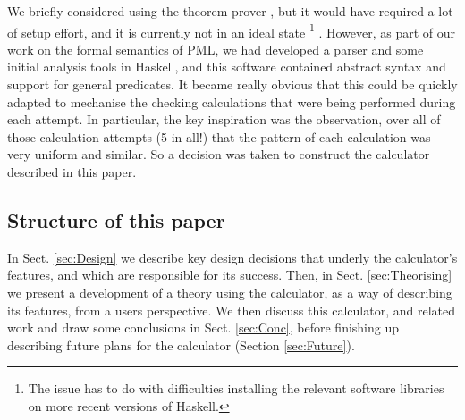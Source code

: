 We briefly considered using the  theorem prover
\cite{DBLP:conf/utp/Butterfield10,DBLP:conf/utp/Butterfield12},
but it would have required a lot of setup effort,
and it is currently not in an ideal state%
\footnote{The issue has to do with difficulties installing
the relevant software libraries
on more recent versions of Haskell.}
.
However, as part of our work on the formal semantics of PML,
we had developed a parser and some initial analysis tools
in Haskell\cite{Haskell2010},
and this software contained abstract syntax and support
for general predicates.
It became really obvious that this could be quickly adapted
to mechanise the checking calculations that were being performed
during each attempt.
In particular,
the key inspiration was the observation,
over all of those calculation attempts (5 in all!)
that the pattern of each calculation was very uniform and similar.
So a decision was taken to construct the calculator described in this paper.



\subsection{Structure of this paper}

In Sect. \ref{sec:Design}
we describe key design decisions
that underly the calculator's features,
and which are responsible for its success.
Then, in Sect. \ref{sec:Theorising}
we present a development of a theory using the calculator,
as a way of describing its features, from a users perspective.
We then discuss this calculator, and related work
and draw some conclusions in Sect. \ref{sec:Conc},
before finishing up describing future plans for the calculator
(Section \ref{sec:Future}).
